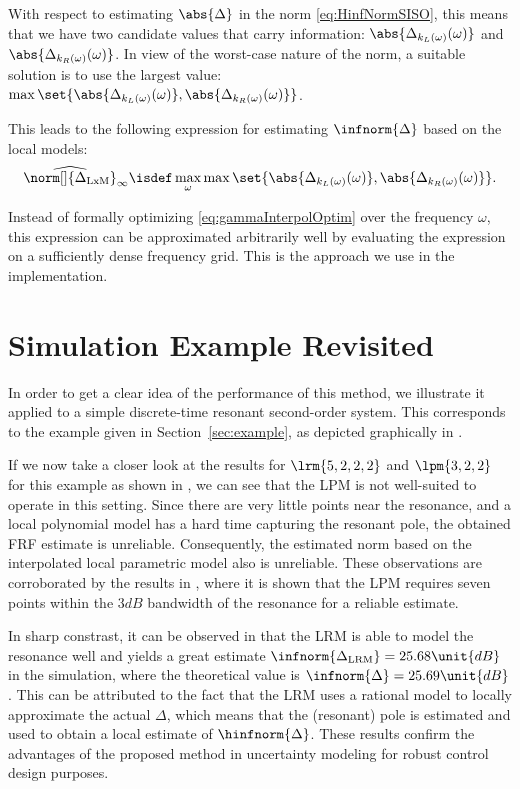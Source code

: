 With respect to estimating $\abs{\Delta}$ in the \Hinf{} norm \eqref{eq:HinfNormSISO}, this means that we have two candidate values that carry information: $\abs{\Delta_{k_L(\omega)}(\omega)}$ and $\abs{\Delta_{k_R(\omega)}(\omega)}$. In view of the worst-case nature of the \Hinf{} norm, a suitable solution is to use the largest value: $\max \set{\abs{\Delta_{k_L(\omega)}(\omega)}, \abs{\Delta_{k_R(\omega)}(\omega)}}$.

This leads to the following expression for estimating $\infnorm{\Delta}$ based on the local models:
\begin{equation}
  \widehat{\norm[]{\Delta_{\mathrm{LxM}}}}_{\infty} \isdef \max_{\omega} \max \set{\abs{\Delta_{k_L(\omega)}(\omega)}, \abs{\Delta_{k_R(\omega)}(\omega)}}
  \label{eq:gammaInterpolOptim}
  \text{.}
\end{equation}

Instead of formally optimizing \eqref{eq:gammaInterpolOptim} over the frequency $\omega$, this expression can be approximated arbitrarily well by evaluating the expression on a sufficiently dense frequency grid.
This is the approach we use in the implementation.

\section{Simulation Example Revisited}
\label{sec:simulation}
In order to get a clear idea of the performance of this method, we illustrate it applied to a simple discrete-time resonant second-order system.
This corresponds to the example given in Section~\ref{sec:example}, as depicted graphically in .

If we now take a closer look at the results for $\lrm{5,2,2,2}$ and $\lpm{3,2,2}$ for this example as shown in , we can see that the \gls{LPM} is not well-suited to operate in this setting.
Since there are very little points near the resonance, and a local polynomial model has a hard time capturing the resonant pole, the obtained \gls{FRF} estimate is unreliable. 
Consequently, the estimated \Hinf{} norm based on the interpolated local parametric model also is unreliable.
These observations are corroborated by the results in \citep{Schoukens2013LPMerror}, where it is shown that the \gls{LPM} requires seven points within the $3 \unit{dB}$ bandwidth of the resonance for a reliable estimate.

In sharp constrast, it can be observed in  that the \gls{LRM} is able to model the resonance well and yields a great estimate $\infnorm{\Delta_{\mathrm{LRM}}} = 25.68 \unit{dB}$ in the simulation, where the theoretical value is $\infnorm{\Delta} = 25.69 \unit{dB}$.
This can be attributed to the fact that the \gls{LRM} uses a rational model to locally approximate the actual $\Delta$, which means that the (resonant) pole is estimated and used to obtain a local estimate of $\hinfnorm{\Delta}$. These results confirm the advantages of the proposed method in uncertainty modeling for robust control design purposes.

